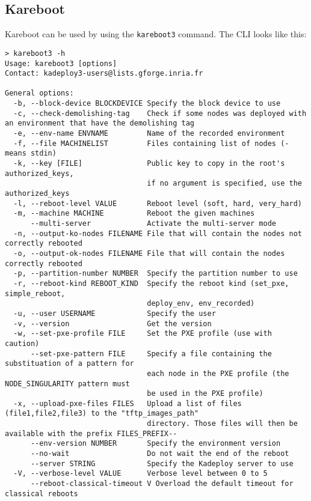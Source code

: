 \documentclass[a4wide,10pt,oneside]{book}
\begin{document}
\subsection{Kareboot}
Kareboot can be used by using the \texttt{kareboot3} command. The CLI looks like this:
\begin{small}
\begin{verbatim}
> kareboot3 -h
Usage: kareboot3 [options]
Contact: kadeploy3-users@lists.gforge.inria.fr

General options:
  -b, --block-device BLOCKDEVICE Specify the block device to use
  -c, --check-demolishing-tag    Check if some nodes was deployed with an environment that have the demolishing tag
  -e, --env-name ENVNAME         Name of the recorded environment
  -f, --file MACHINELIST         Files containing list of nodes (- means stdin)
  -k, --key [FILE]               Public key to copy in the root's authorized_keys, 
                                 if no argument is specified, use the authorized_keys
  -l, --reboot-level VALUE       Reboot level (soft, hard, very_hard)
  -m, --machine MACHINE          Reboot the given machines
      --multi-server             Activate the multi-server mode
  -n, --output-ko-nodes FILENAME File that will contain the nodes not correctly rebooted
  -o, --output-ok-nodes FILENAME File that will contain the nodes correctly rebooted
  -p, --partition-number NUMBER  Specify the partition number to use
  -r, --reboot-kind REBOOT_KIND  Specify the reboot kind (set_pxe, simple_reboot, 
                                 deploy_env, env_recorded)
  -u, --user USERNAME            Specify the user
  -v, --version                  Get the version
  -w, --set-pxe-profile FILE     Set the PXE profile (use with caution)
      --set-pxe-pattern FILE     Specify a file containing the substituation of a pattern for 
                                 each node in the PXE profile (the NODE_SINGULARITY pattern must
                                 be used in the PXE profile)
  -x, --upload-pxe-files FILES   Upload a list of files (file1,file2,file3) to the "tftp_images_path"
                                 directory. Those files will then be available with the prefix FILES_PREFIX--
      --env-version NUMBER       Specify the environment version
      --no-wait                  Do not wait the end of the reboot
      --server STRING            Specify the Kadeploy server to use
  -V, --verbose-level VALUE      Verbose level between 0 to 5
      --reboot-classical-timeout V Overload the default timeout for classical reboots
\end{verbatim}
\end{small}
\end{document}
